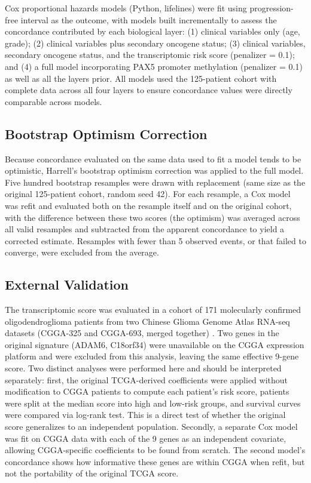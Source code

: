 \documentclass[11pt, letterpaper]{article}
\begin{document}
Cox proportional hazards models (Python, lifelines) were fit using progression-free interval as the outcome, with models built incrementally to assess the concordance contributed by each biological layer: (1) clinical variables only (age, grade); (2) clinical variables plus secondary oncogene status; (3) clinical variables, secondary oncogene status, and the transcriptomic risk score (penalizer = 0.1); and (4) a full model incorporating PAX5 promoter methylation (penalizer = 0.1) as well as all the layers prior. All models used the 125-patient cohort with complete data across all four layers to ensure concordance values were directly comparable across models.

\subsection{Bootstrap Optimism Correction}

Because concordance evaluated on the same data used to fit a model tends to be optimistic, Harrell's bootstrap optimism correction was applied to the full model. Five hundred bootstrap resamples were drawn with replacement (same size as the original 125-patient cohort, random seed 42). For each resample, a Cox model was refit and evaluated both on the resample itself and on the original cohort, with the difference between these two scores (the optimism) was averaged across all valid resamples and subtracted from the apparent concordance to yield a corrected estimate. Resamples with fewer than 5 observed events, or that failed to converge, were excluded from the average.

\subsection{External Validation}

The transcriptomic score was evaluated in a cohort of 171 molecularly confirmed oligodendroglioma patients from two Chinese Glioma Genome Atlas RNA-seq datasets (CGGA-325 and CGGA-693, merged together) \cite{Zhao2021}. Two genes in the original signature (ADAM6, C18orf34) were unavailable on the CGGA expression platform and were excluded from this analysis, leaving the same effective 9-gene score. Two distinct analyses were performed here and should be interpreted separately: first, the original TCGA-derived coefficients were applied without modification to CGGA patients to compute each patient's risk score, patients were split at the median score into high and low-risk groups, and survival curves were compared via log-rank test. This is a direct test of whether the original score generalizes to an independent population. Secondly, a separate Cox model was fit on CGGA data with each of the 9 genes as an independent covariate, allowing CGGA-specific coefficients to be found from scratch. The second model's concordance shows how informative these genes are within CGGA when refit, but not the portability of the original TCGA score. 
\end{document}
